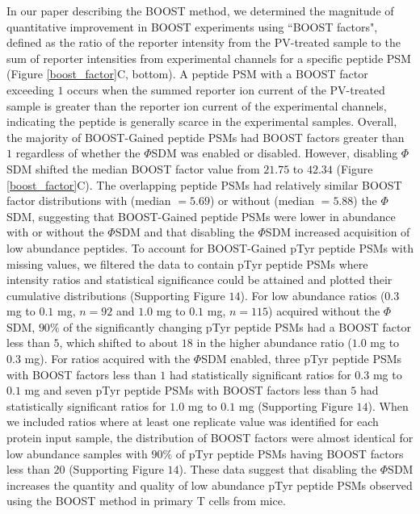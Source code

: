 \documentclass[journal=jprobs,manuscript=article]{achemso}
\begin{document}
In our paper describing the BOOST method, we determined the magnitude of quantitative improvement in BOOST experiments using ``BOOST factors", defined as the ratio of the reporter intensity from the PV-treated sample to the sum of reporter intensities from experimental channels for a specific peptide PSM (Figure \ref{boost_factor}C, bottom)\cite{chua2020tandem}. A peptide PSM with a BOOST factor exceeding $1$ occurs when the summed reporter ion current of the PV-treated sample is greater than the reporter ion current of the experimental channels, indicating the peptide is generally scarce in the experimental samples\cite{chua2020tandem}. Overall, the majority of BOOST-Gained peptide PSMs had BOOST factors greater than $1$ regardless of whether the $\Phi$SDM was enabled or disabled. However, disabling $\Phi$SDM shifted the median BOOST factor value from $21.75$ to $42.34$ (Figure \ref{boost_factor}C). The overlapping peptide PSMs had  relatively similar BOOST factor distributions with (median $=5.69$) or without (median $=5.88$) the $\Phi$SDM, suggesting that BOOST-Gained peptide PSMs were lower in abundance with or without the $\Phi$SDM and that disabling the $\Phi$SDM increased acquisition of low abundance peptides. To account for BOOST-Gained pTyr peptide PSMs with missing values, we filtered the data to contain pTyr peptide PSMs where intensity ratios and statistical significance could be attained and plotted their cumulative distributions (Supporting Figure $14$). For low abundance ratios ($0.3$ mg to $0.1$ mg, $n=92$ and $1.0$ mg to $0.1$ mg, $n=115$) acquired without the $\Phi$SDM, $90\%$ of the significantly changing pTyr peptide PSMs had a BOOST factor less than $5$, which shifted to about $18$ in the higher abundance ratio ($1.0$ mg to $0.3$ mg). For ratios acquired with the $\Phi$SDM enabled, three pTyr peptide PSMs with BOOST factors less than $1$ had statistically significant ratios for $0.3$ mg to $0.1$ mg and seven pTyr peptide PSMs with BOOST factors less than $5$ had statistically significant ratios for $1.0$ mg to $0.1$ mg (Supporting Figure $14$). When we included ratios where at least one replicate value was identified for each protein input sample, the distribution of BOOST factors were almost identical for low abundance samples with $90\%$ of pTyr peptide PSMs having BOOST factors less than $20$ (Supporting Figure $14$). These data suggest that disabling the $\Phi$SDM increases the quantity and quality of low abundance pTyr peptide PSMs observed using the BOOST method in primary T cells from mice.
\end{document}
